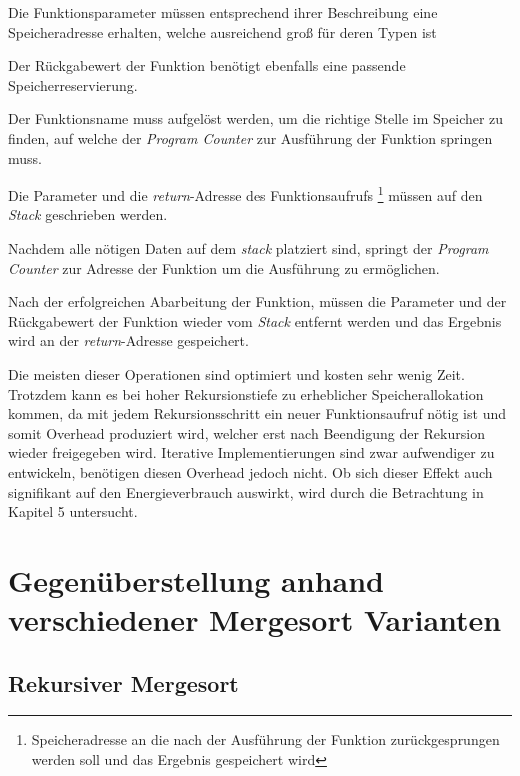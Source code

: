 \begin{aligneddescription}
\item Die Funktionsparameter müssen entsprechend ihrer Beschreibung eine Speicheradresse  erhalten, welche ausreichend groß für deren Typen ist
\item Der Rückgabewert der Funktion benötigt ebenfalls eine passende Speicherreservierung.
\item Der Funktionsname muss aufgelöst werden, um die richtige Stelle im Speicher zu finden, auf welche der \emph{Program Counter} zur Ausführung der Funktion springen muss.
\item Die Parameter und die \emph{return}-Adresse des Funktionsaufrufs \footnote{Speicheradresse an die nach der Ausführung der Funktion zurückgesprungen werden soll und das Ergebnis gespeichert wird} müssen auf den \emph{Stack} geschrieben werden.
\item Nachdem alle nötigen Daten auf dem \emph{stack} platziert sind, springt der \emph{Program Counter} zur Adresse der Funktion um die Ausführung zu ermöglichen.
\item Nach der erfolgreichen Abarbeitung der Funktion, müssen die Parameter und der Rückgabewert der Funktion wieder vom \emph{Stack} entfernt werden und das Ergebnis wird an der \emph{return}-Adresse gespeichert. 
\end{aligneddescription}

Die meisten dieser Operationen sind optimiert und kosten sehr wenig Zeit. Trotzdem kann es bei hoher Rekursionstiefe zu erheblicher Speicherallokation kommen, da mit jedem Rekursionsschritt ein neuer Funktionsaufruf nötig ist und somit Overhead produziert wird, welcher erst nach Beendigung der Rekursion wieder freigegeben wird. Iterative Implementierungen sind zwar aufwendiger zu entwickeln, benötigen diesen Overhead jedoch nicht. Ob sich dieser Effekt auch signifikant auf den Energieverbrauch auswirkt, wird durch die Betrachtung in Kapitel 5 untersucht.

\section{Gegenüberstellung anhand verschiedener Mergesort Varianten}
\subsection{Rekursiver Mergesort}

